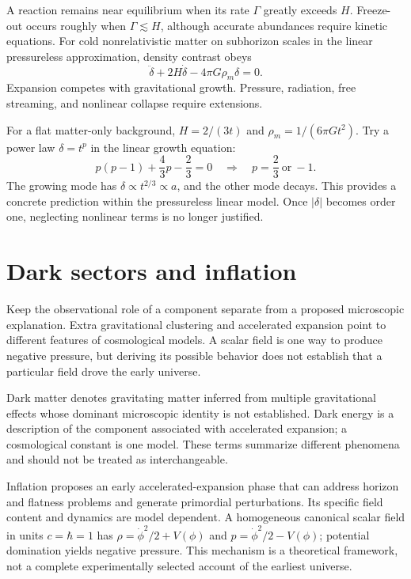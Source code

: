 \documentclass[11pt,oneside]{book}
\theoremstyle{reviewstyle}
\begin{document}
A reaction remains near equilibrium when its rate $\Gamma$ greatly exceeds $H$. Freeze-out occurs roughly when $\Gamma\lesssim H$, although accurate abundances require kinetic equations. For cold nonrelativistic matter on subhorizon scales in the linear pressureless approximation, density contrast obeys
\begin{equation}\ddot\delta+2H\dot\delta-4\pi G\rho_m\delta=0.\end{equation}
Expansion competes with gravitational growth. Pressure, radiation, free streaming, and nonlinear collapse require extensions.

For a flat matter-only background, $H=2/(3t)$ and $\rho_m=1/(6\pi Gt^2)$. Try a power law $\delta=t^p$ in the linear growth equation:
\begin{equation}
p(p-1)+\frac43p-\frac23=0
\quad\Longrightarrow\quad p=\frac23\ \text{or}\ -1.
\end{equation}
The growing mode has $\delta\propto t^{2/3}\propto a$, and the other mode decays. This provides a concrete prediction within the pressureless linear model. Once $|\delta|$ becomes order one, neglecting nonlinear terms is no longer justified.

\section{Dark sectors and inflation}
Keep the observational role of a component separate from a proposed microscopic explanation. Extra gravitational clustering and accelerated expansion point to different features of cosmological models. A scalar field is one way to produce negative pressure, but deriving its possible behavior does not establish that a particular field drove the early universe.

Dark matter denotes gravitating matter inferred from multiple gravitational effects whose dominant microscopic identity is not established. Dark energy is a description of the component associated with accelerated expansion; a cosmological constant is one model. These terms summarize different phenomena and should not be treated as interchangeable.

Inflation proposes an early accelerated-expansion phase that can address horizon and flatness problems and generate primordial perturbations. Its specific field content and dynamics are model dependent. A homogeneous canonical scalar field in units $c=\hbar=1$ has $\rho=\dot\phi^2/2+V(\phi)$ and $p=\dot\phi^2/2-V(\phi)$; potential domination yields negative pressure. This mechanism is a theoretical framework, not a complete experimentally selected account of the earliest universe.
\end{document}
